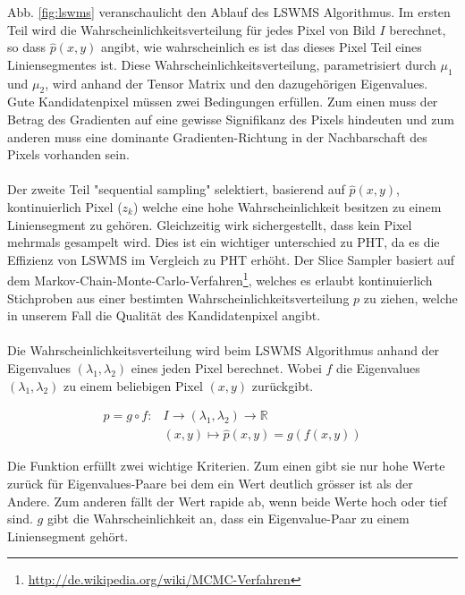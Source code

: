Abb. \ref{fig:lswms} veranschaulicht den Ablauf des LSWMS Algorithmus. Im ersten Teil wird die Wahrscheinlichkeitsverteilung für jedes Pixel von Bild $I$ berechnet, so dass $\hat{p}(x,y)$ angibt, wie wahrscheinlich es ist das dieses Pixel Teil eines Liniensegmentes ist. Diese Wahrscheinlichkeitsverteilung, parametrisiert durch $\mu_1$ und $\mu_2$, wird anhand der Tensor Matrix und den dazugehörigen Eigenvalues. Gute Kandidatenpixel müssen zwei Bedingungen erfüllen. Zum einen muss der Betrag des Gradienten auf eine gewisse Signifikanz des Pixels hindeuten und zum anderen muss eine dominante Gradienten-Richtung in der Nachbarschaft des Pixels vorhanden sein.
\paragraph{}
Der zweite Teil "sequential sampling" selektiert, basierend auf $\hat{p}(x,y)$, kontinuierlich Pixel ($z_k$) welche eine hohe Wahrscheinlichkeit besitzen zu einem Liniensegment zu gehören. Gleichzeitig wirk sichergestellt, dass kein Pixel mehrmals gesampelt wird. Dies ist ein wichtiger unterschied zu PHT, da es die Effizienz von LSWMS im Vergleich zu PHT erhöht. Der Slice Sampler basiert auf dem Markov-Chain-Monte-Carlo-Verfahren\footnote{\protect\url{http://de.wikipedia.org/wiki/MCMC-Verfahren}}, welches es erlaubt kontinuierlich Stichproben aus einer bestimten Wahrscheinlichkeitsverteilung $p$ zu ziehen, welche in unserem Fall die Qualität des Kandidatenpixel angibt.
\paragraph{}
Die Wahrscheinlichkeitsverteilung wird beim LSWMS Algorithmus anhand der Eigenvalues $(\lambda_1, \lambda_2)$ eines jeden Pixel berechnet. Wobei $f$ die Eigenvalues $(\lambda_1, \lambda_2)$ zu einem beliebigen Pixel $(x, y)$ zurückgibt.

\begin{equation}
\begin{split}
p = g \circ f:  &I \to (\lambda_1, \lambda_2) \to \mathbb{R} \\
                &(x, y) \mapsto \hat{p}(x, y) = g(f(x, y))
\end{split}
\end{equation}

Die Funktion erfüllt zwei wichtige Kriterien. Zum einen gibt sie nur hohe Werte zurück für Eigenvalues-Paare bei dem ein Wert deutlich grösser ist als der Andere. Zum anderen fällt der Wert rapide ab, wenn beide Werte hoch oder tief sind. $g$ gibt die Wahrscheinlichkeit an, dass ein Eigenvalue-Paar zu einem Liniensegment gehört.


